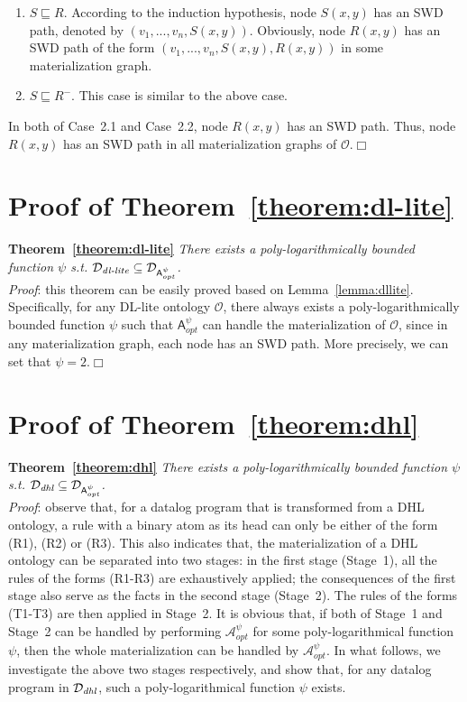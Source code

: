 \begin{enumerate}[leftmargin=12ex,label=Case~2.\arabic*]
\item $S\sqsubseteq R$. According to the induction hypothesis,
node $S(x,y)$ has an SWD path, denoted by $(v_1,...,v_n,S(x,y))$.
Obviously, node $R(x,y)$
has an SWD path of the form $(v_1,...,v_n,S(x,y),R(x,y))$
in some materialization graph.

\item $S\sqsubseteq R^-$. This case is similar to
the above case.
\end{enumerate}

In both of Case~2.1 and Case~2.2, node $R(x,y)$ has an SWD path. Thus,
node $R(x,y)$ has an SWD path in all materialization graphs of $\mathcal{O}$.\hfill$\Box$

\section{Proof of Theorem~\ref{theorem:dl-lite}}

\textbf{Theorem~\ref{theorem:dl-lite}}
\emph{There exists a poly-logarithmically bounded function $\psi$ s.t.
$\mathcal{D}_{\textit{\text{dl-lite}}}\subseteq\mathcal{D}_{\mathsf{A}_{opt}^{\psi}}$.}\\

\noindent\emph{Proof}: this theorem can be easily proved based on Lemma~\ref{lemma:dllite}.
Specifically, for any DL-lite ontology $\mathcal{O}$,
there always exists a poly-logarithmically bounded function $\psi$ such that
$\mathsf{A}_{opt}^{\psi}$ can handle the materialization of $\mathcal{O}$,
since in any materialization graph, each node has an SWD path.
More precisely, we can set that $\psi=2$.\hfill$\Box$


\section{Proof of Theorem~\ref{theorem:dhl}}

\textbf{Theorem~\ref{theorem:dhl}}
\emph{There exists a poly-logarithmically bounded function $\psi$ s.t.
$\mathcal{D}_{\textit{\text{dhl}}}\subseteq\mathcal{D}_{\mathsf{A}_{opt}^{\psi}}$.}\\

\noindent\emph{Proof}: observe that, for a datalog program that is transformed from a DHL ontology,
a rule with a binary atom as its head can only be either of the form (R1), (R2) or (R3).
This also indicates that, the materialization of a DHL
ontology can be separated into two stages: in the first stage (Stage~1), all the rules
of the forms (R1-R3) are exhaustively applied; the consequences of the first stage
also serve as the facts in the second stage (Stage~2). The rules of the forms (T1-T3)
are then applied in Stage~2.
It is obvious that, if both of Stage~1 and Stage~2 can be handled
by performing $\mathcal{A}_{opt}^\psi$ for some poly-logarithmical function $\psi$, then
the whole materialization can be handled by $\mathcal{A}_{opt}^\psi$.
In what follows, we investigate the above two stages respectively, and show that,
for any datalog program in $\mathcal{D}_{\textit{\text{dhl}}}$,
such a poly-logarithmical function $\psi$ exists.

